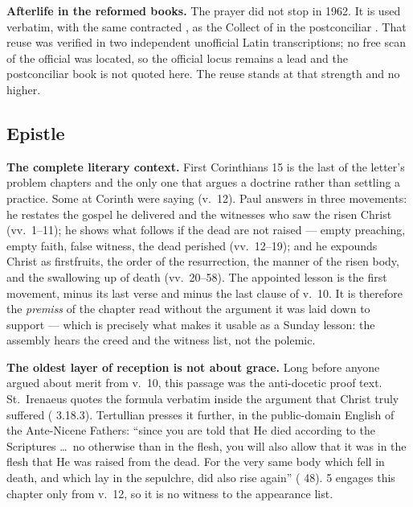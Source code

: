 \textbf{Afterlife in the reformed books.} The prayer did not stop in 1962. It
is used verbatim, with the same contracted , as the Collect of
 in the postconciliar .
That reuse was verified in two independent unofficial Latin transcriptions; no
free scan of the official  was located, so the
official locus remains a lead and the postconciliar book is not quoted here.
The reuse stands at that strength and no higher.

\elementguard
\subsection*{Epistle }


\textbf{The complete literary context.} First Corinthians 15 is the last of the
letter's problem chapters and the only one that argues a doctrine rather than
settling a practice. Some at Corinth were saying  (v.~12). Paul answers in three movements: he restates the gospel he
delivered and the witnesses who saw the risen Christ (vv.~1--11); he shows what
follows if the dead are not raised --- empty preaching, empty faith, false
witness, the dead perished (vv.~12--19); and he expounds Christ as firstfruits,
the order of the resurrection, the manner of the risen body, and the swallowing
up of death (vv.~20--58). The appointed lesson is the first movement, minus its
last verse and minus the last clause of v.~10. It is therefore the
\textit{premiss} of the chapter read without the argument it was laid down to
support --- which is precisely what makes it usable as a Sunday lesson: the
assembly hears the creed and the witness list, not the polemic.

\textbf{The oldest layer of reception is not about grace.} Long before anyone
argued about merit from v.~10, this passage was the anti-docetic proof text.
St.~Irenaeus quotes the formula verbatim inside the argument that Christ truly
suffered ( 3.18.3). Tertullian presses it further, in
the public-domain English of the Ante-Nicene Fathers: ``since you are told that
He died according to the Scriptures \dots\ no otherwise than in the flesh, you
will also allow that it was in the flesh that He was raised from the dead. For
the very same body which fell in death, and which lay in the sepulchre, did
also rise again'' ( 48).  5 engages
this chapter only from v.~12, so it is no witness to the appearance list.

